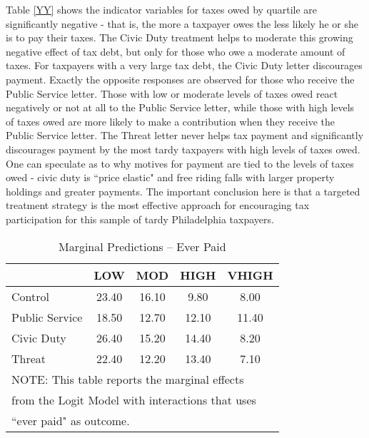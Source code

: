 \documentclass[12pt,titlepage]{article}
\begin{document}
Table \ref{YY} shows the indicator variables for taxes owed by
quartile are significantly negative - that is, the more a taxpayer
owes the less likely he or she is to pay their taxes.  The Civic Duty
treatment helps to moderate this growing negative effect of tax debt,
but only for those who owe a moderate amount of taxes.  For taxpayers
with a very large tax debt, the Civic Duty letter discourages payment.
Exactly the opposite responses are observed for those who receive the
Public Service letter.  Those with low or moderate levels of taxes
owed react negatively or not at all to the Public  Service letter, while those
with high levels of taxes owed are more likely to make a contribution
when they receive the Public Service letter.  The Threat letter never
helps tax payment and significantly discourages payment by the most tardy taxpayers with
high levels of taxes owed.  One can speculate as to why motives for
payment are tied to the levels of taxes owed - civic duty is ``price
elastic" and free riding falls with larger property holdings and
greater payments. The important conclusion here is that a targeted 
treatment strategy is the most effective approach for encouraging 
tax participation for this sample of tardy Philadelphia taxpayers.

\begin{table}[htbp]
\caption{Marginal  Predictions -- Ever Paid}  \label{ZZ} 
\bigskip
\begin{center}
\begin{tabular}{| l | c | c | c | c |}
  \hline
 & LOW & MOD & HIGH & VHIGH \\ 
  \hline
Control & 23.40 & 16.10 & 9.80 & 8.00 \\ 
  Public Service & 18.50 & 12.70 & 12.10 & 11.40 \\ 
  Civic Duty & 26.40 & 15.20 & 14.40 & 8.20 \\ 
  Threat & 22.40 & 12.20 & 13.40 & 7.10 \\ 
   \hline
\multicolumn{5}{l}{NOTE: This table reports the marginal effects} \\
\multicolumn{5}{l}{from the Logit Model with interactions that uses} \\
\multicolumn{5}{l}{``ever paid" as outcome.} \\
\end{tabular}
\end{center}
\end{table}
\end{document}
